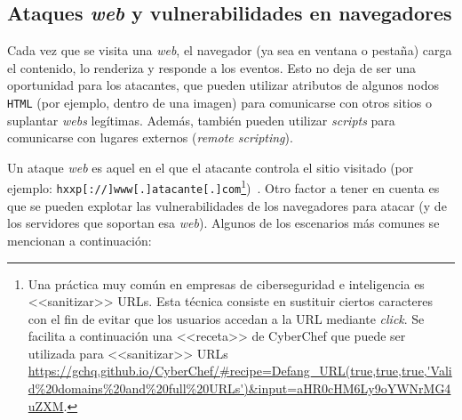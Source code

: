 \subsection{Ataques \textit{web} y vulnerabilidades en navegadores}

Cada vez que se visita una \textit{web}, el navegador (ya sea en ventana o pestaña) carga el contenido, lo renderiza y responde a los eventos. Esto no deja de ser una oportunidad para los atacantes, que pueden utilizar atributos de algunos nodos \texttt{HTML} (por ejemplo, dentro de una imagen) para comunicarse con otros sitios o suplantar \textit{webs} legítimas. Además, también pueden utilizar \textit{scripts} para comunicarse con lugares externos (\textit{remote scripting}).

Un ataque \textit{web} es aquel en el que el atacante controla el sitio visitado (por ejemplo: \texttt{hxxp[://]www[.]atacante[.]com}\footnote{Una práctica muy común en empresas de ciberseguridad e inteligencia es <<sanitizar>> URLs. Esta técnica consiste en sustituir ciertos caracteres con el fin de evitar que los usuarios accedan a la URL mediante \textit{click}. Se facilita a continuación una <<receta>> de CyberChef que puede ser utilizada para <<sanitizar>> URLs \url{https://gchq.github.io/CyberChef/\#recipe=Defang_URL(true,true,true,'Valid\%20domains\%20and\%20full\%20URLs')\&input=aHR0cHM6Ly9oYWNrMG4uZXM}.})~\cite{apuntesCybersec}. Otro factor a tener en cuenta es que se pueden explotar las vulnerabilidades de los navegadores para atacar (y de los servidores que soportan esa \textit{web}). Algunos de los escenarios más comunes se mencionan a continuación:

